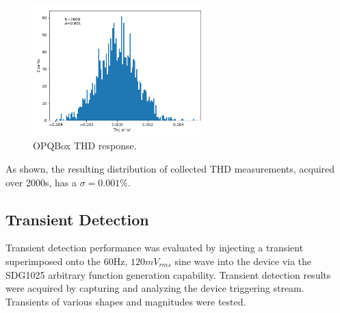 \begin{figure}[ht!]
    \begin{center}
        \includegraphics[width=0.6\textwidth]{img/box_eval/thd_rms.pdf}
    \end{center}
    \caption{OPQBox THD response.}
    \label{fig:expdes:3}
\end{figure}

As shown, the resulting distribution of collected THD measurements, acquired over 2000s, has a $\sigma=0.001\%$.

\subsection{Transient Detection}

Transient detection performance was evaluated by injecting a transient superimposed onto the 60Hz, $120mV_{rms}$ sine wave into the device via the SDG1025 arbitrary function generation capability.
Transient detection results were acquired by capturing and analyzing the device triggering stream.
Transients of various shapes and magnitudes were tested.

